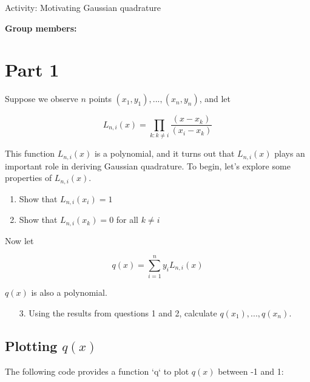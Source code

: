 \documentclass[11pt]{article}
\begin{document}
\begin{center}
\Large
Activity: Motivating Gaussian quadrature \\
\normalsize
\vspace{5mm}
\end{center}

\noindent \textbf{Group members:}



\section*{Part 1}

Suppose we observe $n$ points $(x_1, y_1),...,(x_n, y_n)$, and let

$$L_{n,i}(x) = \prod \limits_{k : k \neq i} \frac{(x - x_k)}{(x_i - x_k)}$$

\noindent This function $L_{n,i}(x)$ is a polynomial, and it turns out that $L_{n,i}(x)$ plays an important role in deriving Gaussian quadrature. To begin, let's explore some properties of $L_{n,i}(x)$.

\begin{enumerate}
\item Show that $L_{n,i}(x_i) = 1$

\vspace{3cm}

\item Show that $L_{n,i}(x_k) = 0$ for all $k \neq i$

\vspace{3cm}
\end{enumerate}

\noindent Now let

$$q(x) = \sum \limits_{i=1}^n y_i L_{n,i}(x)$$

\noindent $q(x)$ is also a polynomial.

\begin{enumerate}
\item[3.] Using the results from questions 1 and 2, calculate $q(x_1),...,q(x_n)$.
\end{enumerate}

\newpage

\subsection*{Plotting $q(x)$}

The following code provides a function `q` to plot $q(x)$ between -1 and 1:
\end{document}
